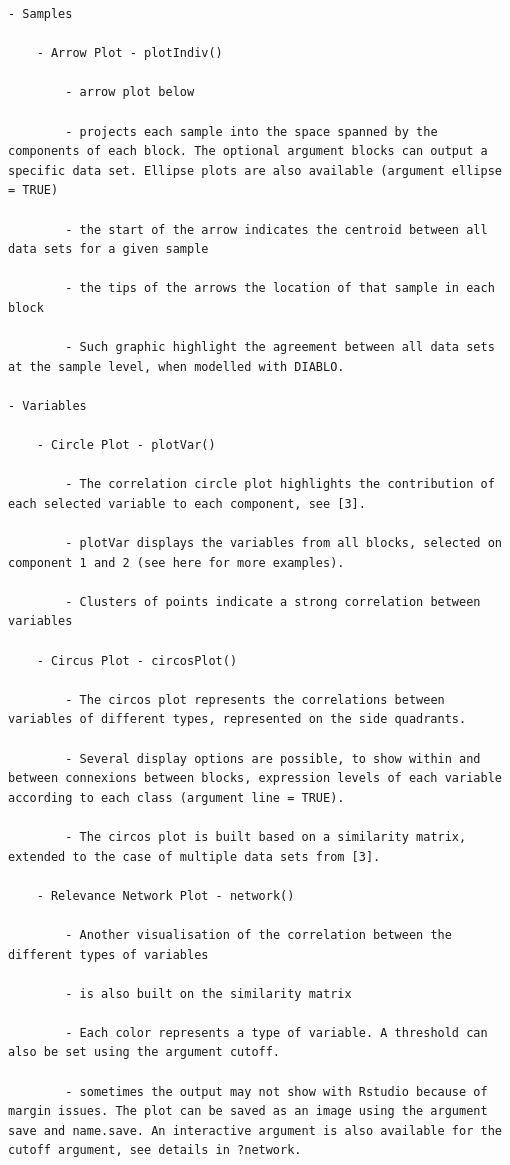 \documentclass[
]{book}
\begin{document}
\begin{verbatim}
- Samples

    - Arrow Plot - plotIndiv()

        - arrow plot below

        - projects each sample into the space spanned by the components of each block. The optional argument blocks can output a specific data set. Ellipse plots are also available (argument ellipse = TRUE)

        - the start of the arrow indicates the centroid between all data sets for a given sample

        - the tips of the arrows the location of that sample in each block

        - Such graphic highlight the agreement between all data sets at the sample level, when modelled with DIABLO.

- Variables

    - Circle Plot - plotVar()

        - The correlation circle plot highlights the contribution of each selected variable to each component, see [3].

        - plotVar displays the variables from all blocks, selected on component 1 and 2 (see here for more examples).

        - Clusters of points indicate a strong correlation between variables

    - Circus Plot - circosPlot()

        - The circos plot represents the correlations between variables of different types, represented on the side quadrants.

        - Several display options are possible, to show within and between connexions between blocks, expression levels of each variable according to each class (argument line = TRUE).

        - The circos plot is built based on a similarity matrix, extended to the case of multiple data sets from [3].

    - Relevance Network Plot - network()

        - Another visualisation of the correlation between the different types of variables

        - is also built on the similarity matrix

        - Each color represents a type of variable. A threshold can also be set using the argument cutoff.

        - sometimes the output may not show with Rstudio because of margin issues. The plot can be saved as an image using the argument save and name.save. An interactive argument is also available for the cutoff argument, see details in ?network.


\end{verbatim}
\end{document}
